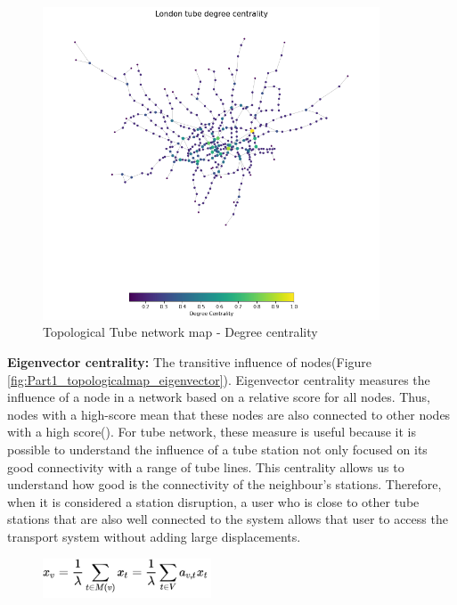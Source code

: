 \documentclass[10pt]{report}
\numberwithin{figure}{section}
\numberwithin{table}{section}
\begin{document}
    \begin{figure}[htp]
        \centering
        \includegraphics[width=10cm]{Image/Part1_topologicalmap_degree.png}
        \caption{Topological Tube network map - Degree centrality}
        \label{fig:Part1_topologicalmap_degree}
    \end{figure}   


        
\newpage  
        
        \textbf{Eigenvector centrality:}  The transitive influence of nodes(Figure \ref{fig:Part1_topologicalmap_eigenvector}). Eigenvector centrality measures the influence of a node in a network based on a relative score for all nodes. Thus, nodes with a high-score mean that these nodes are also connected to other nodes with a high score(\cite{networkx_centrality_2023}). For tube network, these measure is useful because it is possible to understand the influence of a tube station not only focused on its good connectivity with a  range of tube lines. This centrality allows us to understand how good is the connectivity of the neighbour's stations. Therefore, when it is considered a station disruption, a user who is close to other tube stations that are also well connected to the system allows that user to access the transport system without adding large displacements.

    \vspace{5mm} %
        
    \begin{figure}[htp]
        \centering
        \includegraphics[width=5cm]{Image/eigenvector equation.jpeg}
    \end{figure} 
\end{document}

